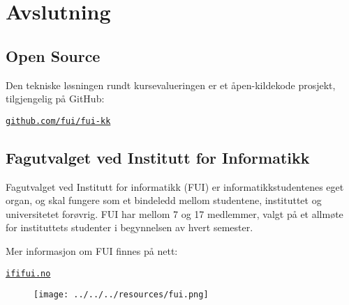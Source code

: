 \chapter{Avslutning}
\newpage

\section{Open Source}
Den tekniske løsningen rundt kursevalueringen er et åpen-kildekode prosjekt, tilgjengelig på GitHub:
\begin{center}
\href{https://github.com/fui/fui-kk}{\texttt{github.com/fui/fui-kk}}
\end{center}

\section{Fagutvalget ved Institutt for Informatikk}
Fagutvalget ved Institutt for informatikk (FUI) er informatikkstudentenes eget organ, og skal
fungere som et bindeledd mellom studentene, instituttet og universitetet forøvrig. FUI har mellom 7 og 17 medlemmer, valgt på et allmøte for instituttets studenter i begynnelsen av hvert semester.

Mer informasjon om FUI finnes på nett:
\begin{center}
\href{http://ififui.no/}{\texttt{ififui.no}}
\end{center}

\begin{figure}[H]
\begin{center}
\texttt{[image: ../../../resources/fui.png]}
\end{center}
\end{figure}


